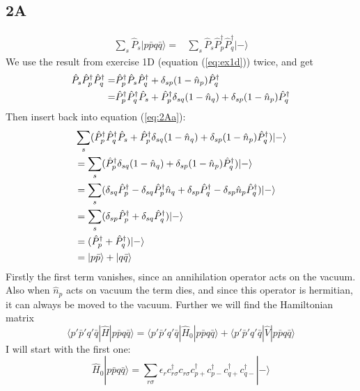 \documentclass[norsk,a4paper,12pt]{article}
\begin{document}
\subsection*{2A}
\begin{align}
\sum_s\hat{P}_s|p\bar{p}q\bar{q}\rangle=&\sum_s\hat{P}_s\hat{P}_p^{\dagger}\hat{P}_q^{\dagger}|-\rangle
\label{eq:2Aa}
\end{align}
We use the result from exercise 1D (equation (\ref{eq:ex1d})) twice, and get
\begin{align*}
\hat{P}_s\hat{P}_p^{\dagger}\hat{P}_q^{\dagger}
=&\hat{P}_p^{\dagger}\hat{P}_s\hat{P}_q^{\dagger}+\delta_{sp}(1-\hat{n}_p)\hat{P}_q^{\dagger}\notag\\
=&\hat{P}_p^{\dagger}\hat{P}_q^{\dagger}\hat{P}_s+\hat{P}_p^{\dagger}\delta_{sq}(1-\hat{n}_q)+\delta_{sp}(1-\hat{n}_p)\hat{P}_q^{\dagger}
\end{align*}
Then insert back into equation (\ref{eq:2Aa}):
\begin{align*}
&\sum_s(\hat{P}_p^{\dagger}\hat{P}_q^{\dagger}\hat{P}_s+\hat{P}_p^{\dagger}\delta_{sq}(1-\hat{n}_q)+\delta_{sp}(1-\hat{n}_p)\hat{P}_q^{\dagger})|-\rangle\notag\\
&=\sum_s(\hat{P}_p^{\dagger}\delta_{sq}(1-\hat{n}_q)+\delta_{sp}(1-\hat{n}_p)\hat{P}_q^{\dagger})|-\rangle\notag\\
&=\sum_s(\delta_{sq}\hat{P}_p^{\dagger}-\delta_{sq}\hat{P}_p^{\dagger}\hat{n}_q+\delta_{sp}\hat{P}_q^{\dagger}-\delta_{sp}\hat{n}_p\hat{P}_q^{\dagger})|-\rangle\notag\\
&=\sum_s(\delta_{sp}\hat{P}_p^{\dagger}+\delta_{sq}\hat{P}_q^{\dagger})|-\rangle\notag\\
&=(\hat{P}_p^{\dagger}+\hat{P}_q^{\dagger})|-\rangle\notag\\
&=|p\bar{p}\rangle+|q\bar{q}\rangle
\end{align*}
Firstly the first term vanishes, since an annihilation operator acts on the vacuum. Also when $\hat{n}_p$ acts on vacuum the term dies, and since this operator is hermitian, it can always be moved to the vacuum. Further we will find the Hamiltonian matrix
\begin{equation*}
\langle p'\bar{p}'q'\bar{q}|\hat{H}|p\bar{p}q\bar{q}\rangle=\langle p'\bar{p}'q'\bar{q}|\hat{H}_0|p\bar{p}q\bar{q}\rangle+\langle p'\bar{p}'q'\bar{q}|\hat{V}|p\bar{p}q\bar{q}\rangle
\end{equation*}
I will start with the first one:
\begin{equation*}
\hat{H}_0|p\bar{p}q\bar{q}\rangle = \sum_{r\sigma}\epsilon_rc_{r\sigma}^{\dagger}c_{r\sigma}c_{p+}^{\dagger}c_{p-}^{\dagger}c_{q+}^{\dagger}c_{q-}^{\dagger}|-\rangle
\end{equation*}
\end{document}

